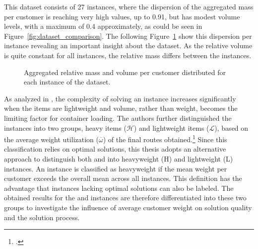 This dataset consists of 27 instances, where the dispersion of the aggregated mass per customer is reaching very high values, up to
0.91, but has modest volume levels, with a maximum of 0.4 approximately, as could be seen in Figure~\ref{fig:dataset_comparison}. The
following Figure~\ref{fig:aggregated_gendreau_plots} show this dispersion per instance revealing an important insight about the dataset.
As the relative volume is quite constant for all instances, the relative mass differs between the instances.
\begin{figure}[ht]
    \centering
    \caption{Aggregated relative mass and volume per customer distributed for each instance of the \gendreauDataSetText dataset.}
    \label{fig:aggregated_gendreau_plots}
\end{figure}
As analyzed in \cite{tamke_branch-and-cut_2024}, the complexity of solving an instance increases significantly when the items are
lightweight and volume, rather than weight, becomes the limiting factor for container loading. The authors further distinguished
the instances into two groups, heavy items ($\mathcal{H}$) and lightweight items ($\mathcal{L}$), based on the average weight
utilization ($\overline{\omega}$) of the final routes obtained.\footcite[cf.][pp. 23--25]{tamke_branch-and-cut_2024}
Since this classification relies on optimal solutions, this thesis adopts an alternative approach to distinguish
both \krebsADataSetText and \gendreauDataSetText into heavyweight (H) and lightweight (L) instances. An instance is classified
as heavyweight if the mean weight per customer exceeds the overall mean across all instances. This definition has the advantage
that instances lacking optimal solutions can also be labeled.
The obtained results for the \gendreauDataSetText and \krebsADataSetText instances are therefore differentiated into these two groups
to investigate the influence of average customer weight on solution quality and the solution process.


